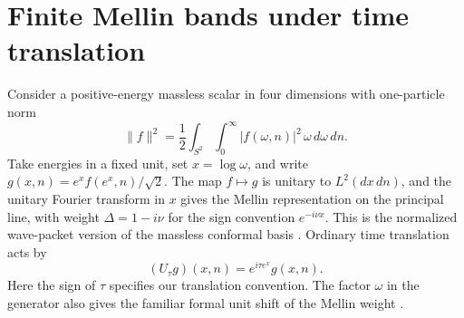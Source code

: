 \section{Finite Mellin bands under time translation}
\label{sec:mellintranslation}
Consider a positive-energy massless scalar in four dimensions with
one-particle norm
\[
 \|f\|^2=\frac12\int_{S^2}\int_0^\infty |f(\omega,n)|^2\,
                   \omega\,d\omega\,dn .
\]
Take energies in a fixed unit, set $x=\log\omega$, and write
$g(x,n)=e^x f(e^x,n)/\sqrt 2$. The map $f\mapsto g$ is unitary to
$L^2(dx\,dn)$, and the unitary Fourier transform in $x$ gives the
Mellin representation on the principal line, with weight
$\Delta=1-i\nu$ for the sign convention $e^{-i\nu x}$.
This is the normalized wave-packet version of the massless conformal
basis \cite{basis}. Ordinary time translation acts by
\[
 (U_\tau g)(x,n)=e^{i\tau e^x}g(x,n).
\]
Here the sign of $\tau$ specifies our translation convention. The
factor $\omega$ in the generator also gives the familiar formal
unit shift of the Mellin weight \cite{lawzlotnikov}.

